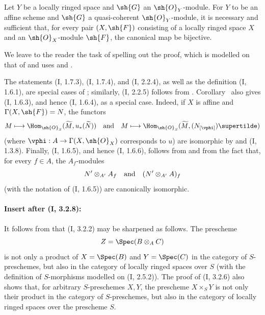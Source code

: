 \begin{corollary}[1.8.10]
\label{ega2:addendum:I.1.8.10}
Let $Y$ be a locally ringed space and $\sh{G}$ an $\sh{O}_Y$-module.
For $Y$ to be an affine scheme and $\sh{G}$ a quasi-coherent
$\sh{O}_Y$-module, it is necessary and sufficient that, for every pair
$(X,\sh{F})$ consisting of a locally ringed space $X$ and an
$\sh{O}_X$-module $\sh{F}$, the canonical map  be
bijective.
\end{corollary}

We leave to the reader the task of spelling out the proof, which is
modelled on that of  and uses  and
.

\begin{remark}[1.8.11]
\label{ega2:addendum:I.1.8.11}
The statements (I, 1.7.3), (I, 1.7.4), and (I, 2.2.4), as well as the
definition (I, 1.6.1), are special cases of ;
similarly, (I, 2.2.5) follows from .
Corollary~ also gives (I, 1.6.3), and hence (I, 1.6.4),
as a special case.  Indeed, if $X$ is affine and
$\Gamma(X,\sh{F})=N$, the functors
\[
  M\longmapsto
  \Hom_{\sh{O}_S}(\widetilde M,u_*(\widetilde N))
  \quad\hbox{and}\quad
  M\longmapsto
  \Hom_{\sh{O}_S}(\widetilde M,(N_{[\vphi]})\supertilde)
\]
(where $\vphi:A\to\Gamma(X,\sh{O}_X)$ corresponds to $u$) are
isomorphic by  and (I, 1.3.8).  Finally, (I, 1.6.5),
and hence (I, 1.6.6), follows from  and from the fact
that, for every $f\in A$, the $A_f$-modules
\[
  N'\otimes_{A'}A_f
  \quad\hbox{and}\quad
  (N'\otimes_{A'}A)_f
\]
(with the notation of (I, 1.6.5)) are canonically isomorphic.
\end{remark}

\paragraph{Insert after (I, 3.2.8):}

\begin{env}[3.2.9]
\label{ega2:addendum:I.3.2.9}
It follows from  that (I, 3.2.2) may be sharpened as
follows.  The prescheme
\[
  Z=\Spec(B\otimes_A C)
\]
is not only a product of $X=\Spec(B)$ and $Y=\Spec(C)$ in the category
of $S$-preschemes, but also in the category of locally ringed spaces
over $S$ (with the definition of $S$-morphisms modelled on
(I, 2.5.2)).  The proof of (I, 3.2.6) also shows that, for arbitrary
$S$-preschemes $X,Y$, the prescheme $X\times_S Y$ is not only their
product in the category of $S$-preschemes, but also in the category of
locally ringed spaces over the prescheme $S$.
\end{env}

